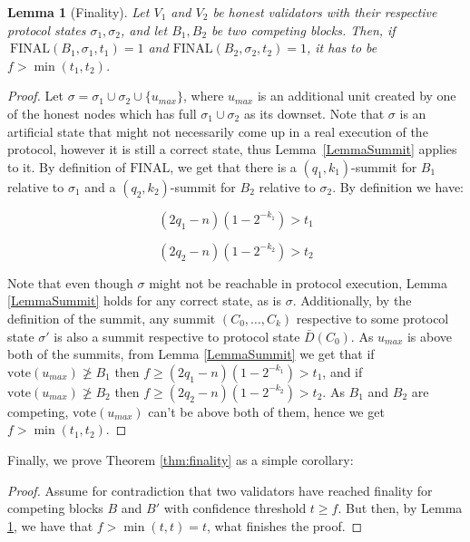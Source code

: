 \documentclass[12pt, fleqn]{article}
\newtheorem{lemma}{Lemma}
\newcommand{\vote}{\mathrm{vote}}
\newcommand{\final}{\mathrm{FINAL}}
\begin{document}
\begin{lemma}[Finality]\label{LemmaFinality}
Let $V_1$ and $V_2$ be honest validators with their respective protocol states $\sigma_1, \sigma_2$, and let $B_1, B_2$ be two competing blocks.
Then, if $\ \final(B_1,\sigma_1,t_1) = 1$ and $\final(B_2,\sigma_2,t_2) = 1$, it has to be $f> \min(t_1,t_2)$.
\end{lemma}



\begin{proof}

Let $\sigma = \sigma_1\cup\sigma_2 \cup \{u_{max}\}$, where $u_{max}$ is an additional unit created by one of the honest nodes which has full $\sigma_1\cup\sigma_2$ as its downset.
Note that $\sigma$ is an artificial state that might not necessarily come up in a real execution of the protocol, however it is still a correct state, thus Lemma~\ref{LemmaSummit} applies to it.
%
By definition of $\final$, we get that there is a $(q_1,k_1)$-summit for $B_1$ relative to $\sigma_1$ and a $(q_2,k_2)$-summit for $B_2$ relative to $\sigma_2$.
By definition we have: 

\begin{equation}\label{EquationFinality1}
(2q_1-n)(1-2^{-k_1})>t_1
\end{equation}

\vspace*{-0.9cm}

\begin{equation}\label{EquationFinality2}
(2q_2-n)(1-2^{-k_2})>t_2
\end{equation}

Note that even though $\sigma$ might not be reachable in protocol execution, Lemma \ref{LemmaSummit} holds for any correct state, as is $\sigma$.
Additionally, by the definition of the summit, any summit $(C_0,\dots,C_k)$ respective to some protocol state $\sigma'$ is also a summit respective to protocol state $\bar{D}(C_0)$.
As $u_{max}$ is above both of the summits, from Lemma \ref{LemmaSummit} we get that if $\vote(u_{max})\not\geq B_1$ then $f\geq (2q_1-n)(1-2^{-k_1})>t_1$, and if  $\vote(u_{max})\not\geq B_2$ then $f\geq (2q_2-n)(1-2^{-k_2})>t_2$.
As $B_1$ and $B_2$ are competing, $\vote(u_{max})$ can't be above both of them, hence we get $f>\min(t_1,t_2)$.

\end{proof}

Finally, we prove Theorem \ref{thm:finality} as a simple corollary:

\begin{proof}
Assume for contradiction that two validators have reached finality for competing blocks $B$ and $B'$ with confidence threshold $t\geq f$.
But then, by Lemma \ref{LemmaFinality}, we have that $f>\min(t,t)=t$, what finishes the proof.
\end{proof}
\end{document}
